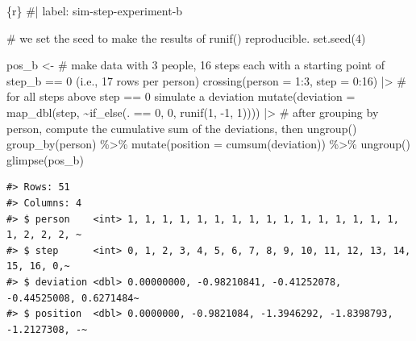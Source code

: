 \documentclass[
  letterpaper,
  DIV=11,
  numbers=noendperiod]{scrreprt}
\newenvironment{Shaded}{\begin{snugshade}}{\end{snugshade}}
\newcommand{\AttributeTok}[1]{\textcolor[rgb]{0.40,0.45,0.13}{#1}}
\newcommand{\CommentTok}[1]{\textcolor[rgb]{0.37,0.37,0.37}{#1}}
\newcommand{\DecValTok}[1]{\textcolor[rgb]{0.68,0.00,0.00}{#1}}
\newcommand{\FunctionTok}[1]{\textcolor[rgb]{0.28,0.35,0.67}{#1}}
\newcommand{\InformationTok}[1]{\textcolor[rgb]{0.37,0.37,0.37}{#1}}
\newcommand{\NormalTok}[1]{\textcolor[rgb]{0.00,0.23,0.31}{#1}}
\newcommand{\OtherTok}[1]{\textcolor[rgb]{0.00,0.23,0.31}{#1}}
\newcommand{\SpecialCharTok}[1]{\textcolor[rgb]{0.37,0.37,0.37}{#1}}
\begin{document}
\begin{Shaded}
\begin{Highlighting}[]
\InformationTok{\textasciigrave{}\textasciigrave{}\textasciigrave{}\{r\}}
\CommentTok{\#| label: sim{-}step{-}experiment{-}b}

\CommentTok{\# we set the seed to make the results of \textasciigrave{}runif()\textasciigrave{} reproducible.}
\FunctionTok{set.seed}\NormalTok{(}\DecValTok{4}\NormalTok{)}

\NormalTok{pos\_b }\OtherTok{\textless{}{-}} 
  \CommentTok{\# make data with 3 people, 16 steps each with a starting point of \textasciigrave{}step\_b == 0\textasciigrave{} (i.e., 17 rows per person)}
  \FunctionTok{crossing}\NormalTok{(}\AttributeTok{person =} \DecValTok{1}\SpecialCharTok{:}\DecValTok{3}\NormalTok{,}
           \AttributeTok{step =} \DecValTok{0}\SpecialCharTok{:}\DecValTok{16}\NormalTok{) }\SpecialCharTok{|\textgreater{}}  
  \CommentTok{\# for all steps above \textasciigrave{}step == 0\textasciigrave{} simulate a \textasciigrave{}deviation\textasciigrave{}}
  \FunctionTok{mutate}\NormalTok{(}\AttributeTok{deviation =} 
             \FunctionTok{map\_dbl}\NormalTok{(step, }\SpecialCharTok{\textasciitilde{}}\FunctionTok{if\_else}\NormalTok{(. }\SpecialCharTok{==} \DecValTok{0}\NormalTok{, }\DecValTok{0}\NormalTok{, }\FunctionTok{runif}\NormalTok{(}\DecValTok{1}\NormalTok{, }\SpecialCharTok{{-}}\DecValTok{1}\NormalTok{, }\DecValTok{1}\NormalTok{)))) }\SpecialCharTok{|\textgreater{}} 
 \CommentTok{\# after grouping by \textasciigrave{}person\textasciigrave{}, compute the cumulative sum of the deviations, then \textasciigrave{}ungroup()\textasciigrave{}}
  \FunctionTok{group\_by}\NormalTok{(person) }\SpecialCharTok{\%\textgreater{}\%}
  \FunctionTok{mutate}\NormalTok{(}\AttributeTok{position =} \FunctionTok{cumsum}\NormalTok{(deviation)) }\SpecialCharTok{\%\textgreater{}\%} 
  \FunctionTok{ungroup}\NormalTok{() }
\FunctionTok{glimpse}\NormalTok{(pos\_b)}
\InformationTok{\textasciigrave{}\textasciigrave{}\textasciigrave{}}
\end{Highlighting}
\end{Shaded}

\begin{verbatim}
#> Rows: 51
#> Columns: 4
#> $ person    <int> 1, 1, 1, 1, 1, 1, 1, 1, 1, 1, 1, 1, 1, 1, 1, 1, 1, 2, 2, 2, ~
#> $ step      <int> 0, 1, 2, 3, 4, 5, 6, 7, 8, 9, 10, 11, 12, 13, 14, 15, 16, 0,~
#> $ deviation <dbl> 0.00000000, -0.98210841, -0.41252078, -0.44525008, 0.6271484~
#> $ position  <dbl> 0.0000000, -0.9821084, -1.3946292, -1.8398793, -1.2127308, -~
\end{verbatim}
\end{document}
